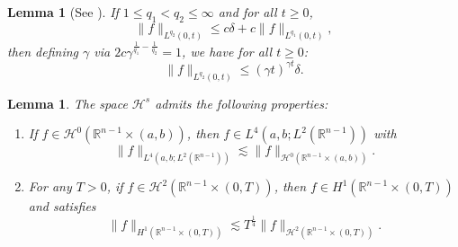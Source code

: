 \documentclass[preprint,compress,12pt]{elsarticle}
\newtheorem{lemma}[theorem]{Lemma}
\numberwithin{equation}{section}
\begin{document}
\begin{lemma}[See \cite{chatter}]\label{holmer}
	If	$1\leq q_{1}<q_{2}\leq\infty$ and for all $t\geq0$,
	\begin{equation}
		\|f\|_{L^{q_{2}}(0,t)}\leq c \delta + c \|f\|_{L^{q_{1}}(0,t)},
	\end{equation}
	then defining $\gamma$ via $2c\gamma^{\frac{1}{q_{1}}-\frac{1}{q_{2}}}=1$, we have for all $t\geq0$:
	\begin{equation}
		\|f\|_{L^{q_{2}}(0,t)}\leq(\gamma t)^{\gamma t}\delta.
	\end{equation}
\end{lemma}
\begin{lemma} The space $\mathcal{H}^{s}$  admits the following properties:
	\begin{enumerate}[label=(\arabic*)]
		\item If $f\in \mathcal{H}^{0}(\mathbb{R}^{n-1}\times(a,b))$, then $f\in L^{4}(a,b;L^{2}(\mathbb{R}^{n-1}))$ with
		\begin{equation}\label{facile}		\|f\|_{L^{4}(a,b;L^{2}(\mathbb{R}^{n-1}))}\lesssim\|f\|_{\mathcal{H}^{0}(\mathbb{R}^{n-1}\times(a,b))}.
		\end{equation}
		\item For any $T>0$, if $f\in \mathcal{H}^{2}(\mathbb{R}^{n-1}\times(0,T))$, then $f\in H^{1}(\mathbb{R}^{n-1}\times(0,T))$ and satisfies
		\begin{equation} \label{pleat}
			\|f\|_{H^{1}(\mathbb{R}^{n-1}\times(0,T))}\lesssim T^{\frac{1}{4}}\|f\|_{\mathcal{H}^{2}(\mathbb{R}^{n-1}\times(0,T))}.
		\end{equation}
	\end{enumerate}
\end{lemma}
\end{document}
